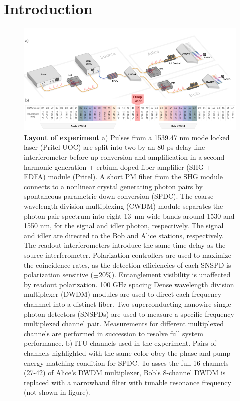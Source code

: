 \documentclass[11pt]{caltech_thesis} %
\begin{document}
\hypertarget{introduction-4}{%
\section{Introduction}\label{introduction-4}}

\hypertarget{fig:system}{%
\begin{figure}
\centering
\includegraphics[width=1\textwidth,height=\textheight]{./chapter_05/figs/sys_drawing_light.pdf}
\caption[{Layout of experiment}]{\textbf{Layout of experiment} a) Pulses from a 1539.47 nm mode locked laser (Pritel UOC) are split into two by an 80-ps delay-line interferometer before up-conversion and amplification in a second harmonic generation + erbium doped fiber amplifier (SHG + EDFA) module (Pritel). A short PM fiber from the SHG module connects to a nonlinear crystal generating photon pairs by spontaneous parametric down-conversion (SPDC). The coarse wavelength division multiplexing (CWDM) module separates the photon pair spectrum into eight 13~nm-wide bands around 1530 and 1550 nm, for the signal and idler photon, respectively. The signal and idler are directed to the Bob and Alice stations, respectively. The readout interferometers introduce the same time delay as the source interferometer. Polarization controllers are used to maximize the coincidence rates, as the detection efficiencies of each SNSPD is polarization sensitive ($\pm20\%$). Entanglement visibility is unaffected by readout polarization. 100 GHz spacing Dense wavelength division multiplexer (DWDM) modules are used to direct each frequency channnel into a distinct fiber. Two superconducting nanowire single photon detectors (SNSPDs) are used to measure a specific frequency multiplexed channel pair. Measurements for different multiplexed channels are performed in succession to resolve full system performance. b) ITU channels used in the experiment. Pairs of channels highlighted with the same color obey the phase and pump-energy matching condition for SPDC. To asses the full 16 channels (27-42) of Alice's DWDM multiplexer, Bob's 8-channel DWDM is replaced with a narrowband filter with tunable resonance frequency (not shown in figure).}
\label{fig:system}
\end{figure}
}
\end{document}
